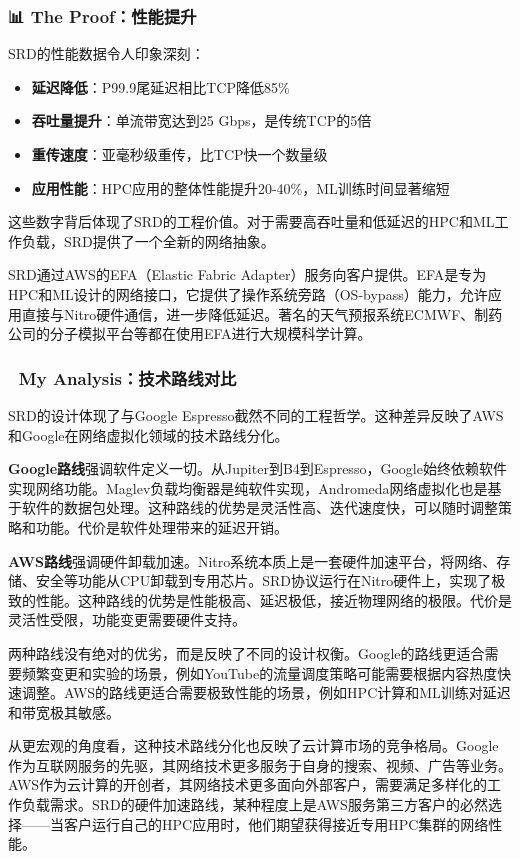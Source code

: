 \subsubsection{📊 The Proof：性能提升}

SRD的性能数据令人印象深刻：

\begin{itemize}
    \item \textbf{延迟降低}：P99.9尾延迟相比TCP降低85\%
    \item \textbf{吞吐量提升}：单流带宽达到25 Gbps，是传统TCP的5倍
    \item \textbf{重传速度}：亚毫秒级重传，比TCP快一个数量级
    \item \textbf{应用性能}：HPC应用的整体性能提升20-40\%，ML训练时间显著缩短
\end{itemize}

这些数字背后体现了SRD的工程价值。对于需要高吞吐量和低延迟的HPC和ML工作负载，SRD提供了一个全新的网络抽象。

SRD通过AWS的EFA（Elastic Fabric Adapter）服务向客户提供。EFA是专为HPC和ML设计的网络接口，它提供了操作系统旁路（OS-bypass）能力，允许应用直接与Nitro硬件通信，进一步降低延迟。著名的天气预报系统ECMWF、制药公司的分子模拟平台等都在使用EFA进行大规模科学计算。

\subsubsection{🧠 My Analysis：技术路线对比}

SRD的设计体现了与Google Espresso截然不同的工程哲学。这种差异反映了AWS和Google在网络虚拟化领域的技术路线分化。

\textbf{Google路线}强调软件定义一切。从Jupiter到B4到Espresso，Google始终依赖软件实现网络功能。Maglev负载均衡器是纯软件实现，Andromeda网络虚拟化也是基于软件的数据包处理。这种路线的优势是灵活性高、迭代速度快，可以随时调整策略和功能。代价是软件处理带来的延迟开销。

\textbf{AWS路线}强调硬件卸载加速。Nitro系统本质上是一套硬件加速平台，将网络、存储、安全等功能从CPU卸载到专用芯片。SRD协议运行在Nitro硬件上，实现了极致的性能。这种路线的优势是性能极高、延迟极低，接近物理网络的极限。代价是灵活性受限，功能变更需要硬件支持。

两种路线没有绝对的优劣，而是反映了不同的设计权衡。Google的路线更适合需要频繁变更和实验的场景，例如YouTube的流量调度策略可能需要根据内容热度快速调整。AWS的路线更适合需要极致性能的场景，例如HPC计算和ML训练对延迟和带宽极其敏感。

从更宏观的角度看，这种技术路线分化也反映了云计算市场的竞争格局。Google作为互联网服务的先驱，其网络技术更多服务于自身的搜索、视频、广告等业务。AWS作为云计算的开创者，其网络技术更多面向外部客户，需要满足多样化的工作负载需求。SRD的硬件加速路线，某种程度上是AWS服务第三方客户的必然选择——当客户运行自己的HPC应用时，他们期望获得接近专用HPC集群的网络性能。

